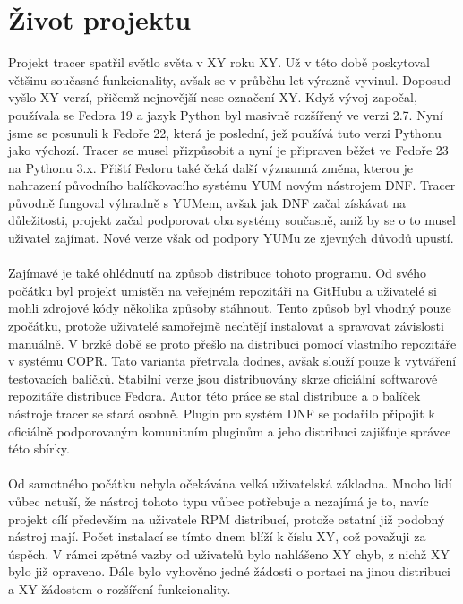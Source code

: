 \documentclass[10pt,a4paper]{article}
\begin{document}
	\section{Život projektu}
	Projekt tracer spatřil světlo světa v XY roku XY. Už v této době poskytoval většinu současné funkcionality, avšak se v průběhu let výrazně vyvinul. Doposud vyšlo XY verzí, přičemž nejnovější nese označení XY. Když vývoj započal, používala se Fedora 19 a jazyk Python byl masivně rozšířený ve verzi 2.7. Nyní jsme se posunuli k Fedoře 22, která je poslední, jež používá tuto verzi Pythonu jako výchozí. Tracer se musel přizpůsobit a nyní je připraven běžet ve Fedoře 23 na Pythonu 3.x. Přiští Fedoru také čeká další významná změna, kterou je nahrazení původního balíčkovacího systému YUM novým nástrojem DNF. Tracer původně fungoval výhradně s YUMem, avšak jak DNF začal získávat na důležitosti, projekt začal podporovat oba systémy současně, aniž by se o to musel uživatel zajímat. Nové verze však od podpory YUMu ze zjevných důvodů upustí.
	\\
	\\
	Zajímavé je také ohlédnutí na způsob distribuce tohoto programu. Od svého počátku byl projekt umístěn na veřejném repozitáři na GitHubu a uživatelé si mohli zdrojové kódy několika způsoby stáhnout. Tento způsob byl vhodný pouze zpočátku, protože uživatelé samořejmě nechtějí instalovat a spravovat závislosti manuálně. V brzké době se proto přešlo na distribuci pomocí vlastního repozitáře v systému COPR. Tato varianta přetrvala dodnes, avšak slouží pouze k vytváření testovacích balíčků. Stabilní verze jsou distribuovány skrze oficiální softwarové repozitáře distribuce Fedora. Autor této práce se stal  distribuce a o balíček nástroje tracer se stará osobně. Plugin pro systém DNF se podařilo připojit k oficiálně podporovaným komunitním pluginům a jeho distribuci zajišťuje správce této sbírky.
	\\
	\\
	Od samotného počátku nebyla očekávána velká uživatelská základna. Mnoho lidí vůbec netuší, že nástroj tohoto typu vůbec potřebuje a nezajímá je to, navíc projekt cílí především na uživatele RPM distribucí, protože ostatní již podobný nástroj mají. Počet instalací se tímto dnem blíží k číslu XY, což považuji za úspěch. V rámci zpětné vazby od uživatelů bylo nahlášeno XY chyb, z nichž XY bylo již opraveno. Dále bylo vyhověno jedné žádosti o portaci na jinou distribuci a XY žádostem o rozšíření funkcionality.
\end{document}

